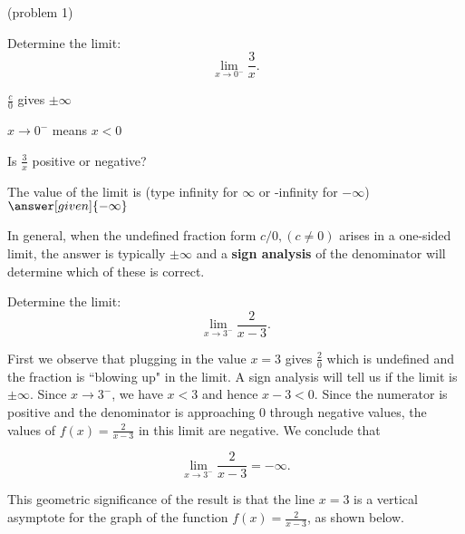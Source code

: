 \documentclass{ximera}
\begin{document}
\begin{problem}(problem 1)
  
	Determine the limit:
  \[
  \lim_{x \to 0^-} \frac{3}{x}.
  \]
		
		\begin{hint}
      $\frac{c}{0}$ gives $\pm \infty$
    \end{hint}
    \begin{hint}
      $x \to 0^-$ means $x<0$
    \end{hint}
    \begin{hint}
      Is $\frac{3}{x}$ positive or negative?
    \end{hint}
    
		The value of the limit  is
		(type infinity for $\infty$ or -infinity for $-\infty$)
		 $\answer[given]{-\infty}$
		
\end{problem}
In general, when the undefined fraction form $c/0, (c\neq 0)$
arises in a one-sided limit, the answer is typically $\pm \infty$ and
a \textbf{sign analysis} of the denominator will determine which of these is correct.

\begin{example}[example 2]
Determine the limit: 
\[
\lim_{x \to 3^-} \frac{2}{x-3}.
\] 


First we observe that plugging in the value $x=3$ gives $\frac{2}{0}$ which is undefined and 
the fraction is ``blowing up" in the limit.  A sign analysis will tell us if the limit is $\pm\infty$.
Since $x \to 3^-$, we have $x<3$ and hence $x-3 <0$. 
Since the numerator is positive and the denominator is approaching $0$ through negative values,
the values of $f(x) = \frac{2}{x-3}$ in this limit are negative.  We conclude that

\[
\lim_{x \to 3^-} \frac{2}{x-3} =  -\infty. 
\]

This geometric significance of the result is that the line $x=3$ is a vertical asymptote for the 
graph of the function $f(x) = \frac{2}{x-3}$, as shown below.




\begin{center}
\end{center}
\end{example}
\end{document}
